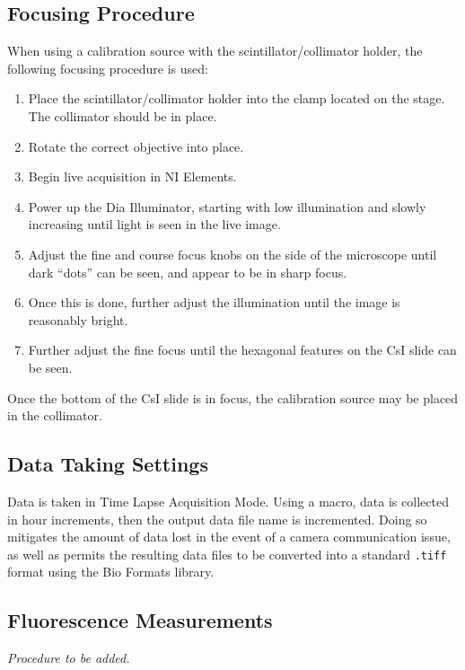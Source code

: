 \documentclass[11pt]{article}
\begin{document}
\subsection{Focusing Procedure}
When using a calibration source with the scintillator/collimator holder, the following focusing procedure is used:
\begin{enumerate}
\item Place the scintillator/collimator holder into the clamp located on the stage. The collimator should be in place. 
\item Rotate the correct objective into place. 
\item Begin live acquisition in NI Elements. 
\item Power up the Dia Illuminator, starting with low illumination and slowly increasing until light is seen in the live image. 
\item Adjust the fine and course focus knobs on the side of the microscope until dark ``dots'' can be seen, and appear to be in sharp focus. 
\item Once this is done, further adjust the illumination until the image is reasonably bright. 
\item Further adjust the fine focus until the hexagonal features on the CsI slide can be seen. 
\end{enumerate}
Once the bottom of the CsI slide is in focus, the calibration source may be placed in the collimator. 
\subsection{Data Taking Settings}
Data is taken in Time Lapse Acquisition Mode. Using a macro, data is collected in hour increments, then the output data file name is incremented. Doing so mitigates the 
amount of data lost in the event of a camera communication issue, as well as permits the resulting data files to be converted into a standard \verb+.tiff+ format using the Bio Formats library. 

\subsection{Fluorescence Measurements}
\emph{Procedure to be added.}
\end{document}
